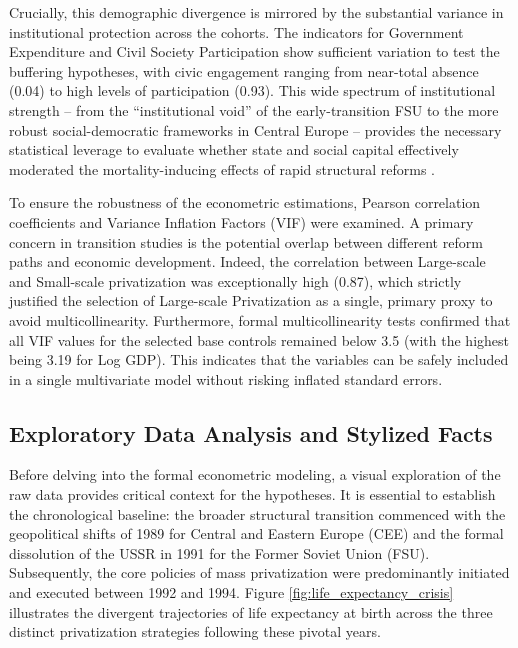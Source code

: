 \documentclass[en,magisterska]{pracamgr}
\begin{document}
Crucially, this demographic divergence is mirrored by the substantial variance in institutional protection across the cohorts. The indicators for Government 
Expenditure and Civil Society Participation show sufficient variation to test the buffering hypotheses, with civic engagement ranging from near-total absence 
(0.04) to high levels of participation (0.93). This wide spectrum of institutional strength -- from the ``institutional void'' of the early-transition FSU to 
the more robust social-democratic frameworks in Central Europe -- provides the necessary statistical leverage to evaluate whether state and social capital 
effectively moderated the mortality-inducing effects of rapid structural reforms \citep{Cornia2016, Hamm2012}.

To ensure the robustness of the econometric estimations, Pearson correlation coefficients and Variance Inflation Factors (VIF) were examined. A primary 
concern in transition studies is the potential overlap between different reform paths and economic development. Indeed, the correlation between Large-scale 
and Small-scale privatization was exceptionally high (0.87), which strictly justified the selection of Large-scale Privatization as a single, primary proxy 
to avoid multicollinearity. Furthermore, formal multicollinearity tests confirmed that all VIF values for the selected base controls remained below 3.5 (with 
the highest being 3.19 for Log GDP). This indicates that the variables can be safely included in a single multivariate model without risking inflated standard 
errors.

\subsection{Exploratory Data Analysis and Stylized Facts}

Before delving into the formal econometric modeling, a visual exploration of the raw data provides critical context for the hypotheses. It is essential to establish 
the chronological baseline: the broader structural transition commenced with the geopolitical shifts of 1989 for Central and Eastern Europe (CEE) and the formal 
dissolution of the USSR in 1991 for the Former Soviet Union (FSU). Subsequently, the core policies of mass privatization were predominantly initiated and executed 
between 1992 and 1994. Figure \ref{fig:life_expectancy_crisis} illustrates the divergent trajectories of life expectancy at birth across the three distinct privatization 
strategies following these pivotal years.
\end{document}
